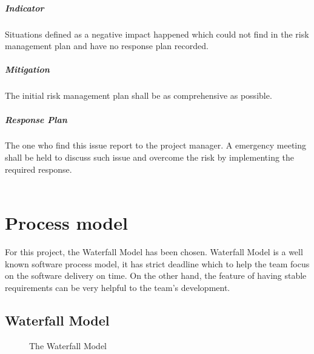 \documentclass[11pt, a4paper]{report}
\begin{document}
	\paragraph{Indicator}Situations defined as a negative impact happened which could not find in the risk management plan and have no response plan recorded.
	\paragraph{Mitigation}The initial risk management plan shall be as comprehensive as possible.
	\paragraph{Response Plan}The one who find this issue report to the project manager. A emergency meeting shall be held to discuss such issue and overcome the risk by implementing the required response.  \\\\


\pagebreak
\chapter{Process model}
For this project, the Waterfall Model has been chosen. Waterfall Model is a well known software process model, it has strict deadline which to help the team focus on the software delivery on time. On the other hand, the feature of having stable requirements can be very helpful to the team's development. 

\section{Waterfall Model}

\begin{figure}[ht]
\centering
\setlength\fboxsep{2pt}
\setlength\fboxrule{0.2pt}
\caption{The Waterfall Model}
\label{sec:WTF}
\label{fig:WTF}
\end{figure}
\end{document}
